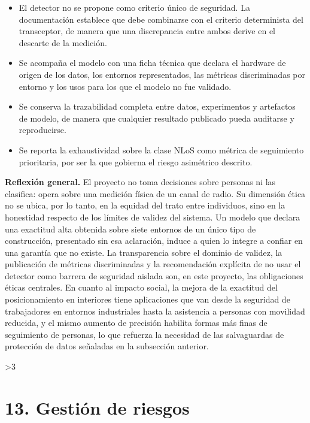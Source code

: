 \documentclass[
11pt, %
]{charter}
\providecommand{\revision}{1}
\begin{document}
\begin{itemize}
    \item El detector no se propone como criterio único de seguridad. La documentación establece que debe combinarse con el criterio determinista del transceptor, de manera que una discrepancia entre ambos derive en el descarte de la medición.
    \item Se acompaña el modelo con una ficha técnica que declara el hardware de origen de los datos, los entornos representados, las métricas discriminadas por entorno y los usos para los que el modelo no fue validado.
    \item Se conserva la trazabilidad completa entre datos, experimentos y artefactos de modelo, de manera que cualquier resultado publicado pueda auditarse y reproducirse.
    \item Se reporta la exhaustividad sobre la clase NLoS como métrica de seguimiento prioritaria, por ser la que gobierna el riesgo asimétrico descrito.
\end{itemize}

\textbf{Reflexión general.} El proyecto no toma decisiones sobre personas ni las clasifica: opera sobre una medición física de un canal de radio. Su dimensión ética no se ubica, por lo tanto, en la equidad del trato entre individuos, sino en la honestidad respecto de los límites de validez del sistema. Un modelo que declara una exactitud alta obtenida sobre siete entornos de un único tipo de construcción, presentado sin esa aclaración, induce a quien lo integre a confiar en una garantía que no existe. La transparencia sobre el dominio de validez, la publicación de métricas discriminadas y la recomendación explícita de no usar el detector como barrera de seguridad aislada son, en este proyecto, las obligaciones éticas centrales. En cuanto al impacto social, la mejora de la exactitud del posicionamiento en interiores tiene aplicaciones que van desde la seguridad de trabajadores en entornos industriales hasta la asistencia a personas con movilidad reducida, y el mismo aumento de precisión habilita formas más finas de seguimiento de personas, lo que refuerza la necesidad de las salvaguardas de protección de datos señaladas en la subsección anterior.
\else\fi

\ifnum\revision>3
\section{13. Gestión de riesgos}
\label{sec:riesgos}
\end{document}
